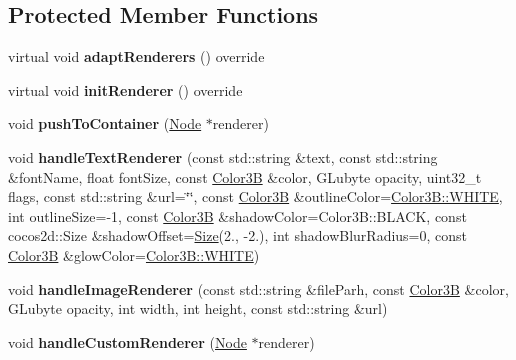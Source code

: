 \subsection*{Protected Member Functions}
\begin{DoxyCompactItemize}
\item 
\mbox{\label{classui_1_1RichText_a588bd6db644fdfc6205948503f007c9c}} 
virtual void {\bfseries adapt\+Renderers} () override
\item 
\mbox{\label{classui_1_1RichText_ab39e5ede39b969ec3c5c5495f60423f3}} 
virtual void {\bfseries init\+Renderer} () override
\item 
\mbox{\label{classui_1_1RichText_ad61247d0c0acb2218b034a12dc6fc6e4}} 
void {\bfseries push\+To\+Container} (\hyperlink{classNode}{Node} $\ast$renderer)
\item 
\mbox{\label{classui_1_1RichText_ab5129556f3cf8b4c1b5b63c391aba47d}} 
void {\bfseries handle\+Text\+Renderer} (const std\+::string \&text, const std\+::string \&font\+Name, float font\+Size, const \hyperlink{structColor3B}{Color3B} \&color, G\+Lubyte opacity, uint32\+\_\+t flags, const std\+::string \&url=\char`\"{}\char`\"{}, const \hyperlink{structColor3B}{Color3B} \&outline\+Color=\hyperlink{structColor3B_adf57cb86ca15f434b29215ad471cdc35}{Color3\+B\+::\+W\+H\+I\+TE}, int outline\+Size=-\/1, const \hyperlink{structColor3B}{Color3B} \&shadow\+Color=Color3\+B\+::\+B\+L\+A\+CK, const cocos2d\+::\+Size \&shadow\+Offset=\hyperlink{classSize}{Size}(2., -\/2.), int shadow\+Blur\+Radius=0, const \hyperlink{structColor3B}{Color3B} \&glow\+Color=\hyperlink{structColor3B_adf57cb86ca15f434b29215ad471cdc35}{Color3\+B\+::\+W\+H\+I\+TE})
\item 
\mbox{\label{classui_1_1RichText_ab05036e02db2af3e34cd50a20451a8d1}} 
void {\bfseries handle\+Image\+Renderer} (const std\+::string \&file\+Parh, const \hyperlink{structColor3B}{Color3B} \&color, G\+Lubyte opacity, int width, int height, const std\+::string \&url)
\item 
\mbox{\label{classui_1_1RichText_a403610d2ba44e45be8337e077d8e4920}} 
void {\bfseries handle\+Custom\+Renderer} (\hyperlink{classNode}{Node} $\ast$renderer)

\end{DoxyCompactItemize}
